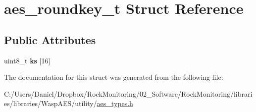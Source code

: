 \hypertarget{structaes__roundkey__t}{}\section{aes\+\_\+roundkey\+\_\+t Struct Reference}
\label{structaes__roundkey__t}
\subsection*{Public Attributes}
\begin{DoxyCompactItemize}
\item 
uint8\+\_\+t {\bfseries ks} \mbox{[}16\mbox{]}\hypertarget{structaes__roundkey__t_a267994af3b4d2731dc8e0c38456c2d23}{}\label{structaes__roundkey__t_a267994af3b4d2731dc8e0c38456c2d23}

\end{DoxyCompactItemize}


The documentation for this struct was generated from the following file\+:\begin{DoxyCompactItemize}
\item 
C\+:/\+Users/\+Daniel/\+Dropbox/\+Rock\+Monitoring/02\+\_\+\+Software/\+Rock\+Monitoring/libraries/libraries/\+Wasp\+A\+E\+S/utility/\hyperlink{aes__types_8h}{aes\+\_\+types.\+h}\end{DoxyCompactItemize}
